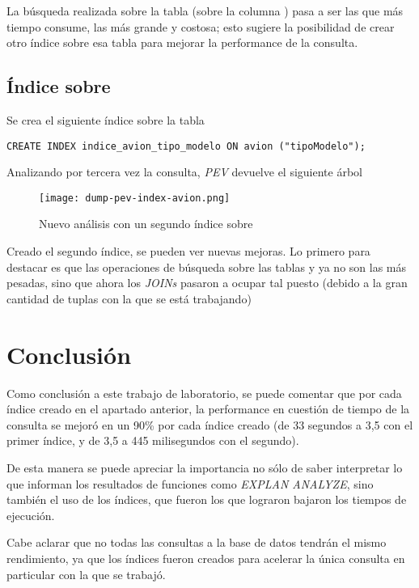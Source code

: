 La búsqueda realizada sobre la tabla \emph{} (sobre la columna \emph{}) pasa a ser las que más tiempo consume, las más grande y costosa; esto sugiere la posibilidad de crear otro índice sobre esa tabla para mejorar la performance de la consulta. 

\subsection{Índice sobre \emph{}}

Se crea el siguiente índice sobre la tabla \emph{} 
\vspace*{5mm}
\begin{lstlisting}
CREATE INDEX indice_avion_tipo_modelo ON avion ("tipoModelo");
\end{lstlisting}

Analizando por tercera vez la consulta, \emph{PEV} devuelve el siguiente árbol 
\begin{figure}[H]
    \texttt{[image: dump-pev-index-avion.png]}
    \caption{Nuevo análisis con un segundo índice sobre \emph{}}
\end{figure}

Creado el segundo índice, se pueden ver nuevas mejoras. Lo primero para destacar es que las operaciones de búsqueda sobre las tablas \emph{} y \emph{} ya no son las más pesadas, sino que ahora los \emph{JOINs} pasaron a ocupar tal puesto (debido a la gran cantidad de tuplas con la que se está trabajando)   

\section{Conclusión}

Como conclusión a este trabajo de laboratorio, se puede comentar que por cada índice creado en el apartado anterior, la performance en cuestión de tiempo de la consulta se mejoró en un 90\% por cada índice creado (de 33 segundos a 3,5 con el primer índice, y de 3,5 a 445 milisegundos con el segundo). 

De esta manera se puede apreciar la importancia no sólo de saber interpretar lo que informan los resultados de funciones como \emph{EXPLAN ANALYZE}, sino también el uso de los índices, que fueron los que lograron bajaron los tiempos de ejecución. 

Cabe aclarar que no todas las consultas a la base de datos tendrán el mismo rendimiento, ya que los índices fueron creados para acelerar la única consulta en particular con la que se trabajó.







\clearpage




